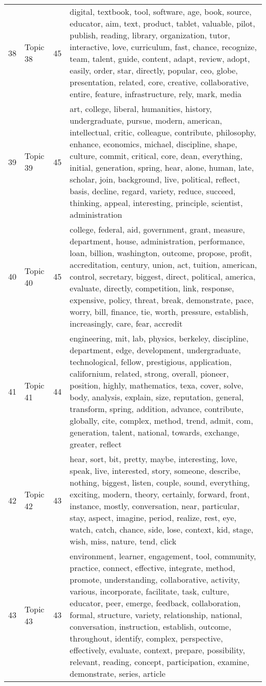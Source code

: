 \begin{table}[ht]
{\begin{tabularx}{\textwidth}{llrX}
   38 & Topic 38 & 45 & digital, textbook, tool, software, age, book, source, educator, aim, text, product, tablet, valuable, pilot, publish, reading, library, organization, tutor, interactive, love, curriculum, fast, chance, recognize, team, talent, guide, content, adapt, review, adopt, easily, order, star, directly, popular, ceo, globe, presentation, related, core, creative, collaborative, entire, feature, infrastructure, rely, mark, media \\ 
   39 & Topic 39 & 45 & art, college, liberal, humanities, history, undergraduate, pursue, modern, american, intellectual, critic, colleague, contribute, philosophy, enhance, economics, michael, discipline, shape, culture, commit, critical, core, dean, everything, initial, generation, spring, hear, alone, human, late, scholar, join, background, live, political, reflect, basis, decline, regard, variety, reduce, succeed, thinking, appeal, interesting, principle, scientist, administration \\ 
   40 & Topic 40 & 45 & college, federal, aid, government, grant, measure, department, house, administration, performance, loan, billion, washington, outcome, propose, profit, accreditation, century, union, act, tuition, american, control, secretary, biggest, direct, political, america, evaluate, directly, competition, link, response, expensive, policy, threat, break, demonstrate, pace, worry, bill, finance, tie, worth, pressure, establish, increasingly, care, fear, accredit \\ 
   41 & Topic 41 & 44 & engineering, mit, lab, physics, berkeley, discipline, department, edge, development, undergraduate, technological, fellow, prestigious, application, californium, related, strong, overall, pioneer, position, highly, mathematics, texa, cover, solve, body, analysis, explain, size, reputation, general, transform, spring, addition, advance, contribute, globally, cite, complex, method, trend, admit, com, generation, talent, national, towards, exchange, greater, reflect \\ 
   42 & Topic 42 & 43 & hear, sort, bit, pretty, maybe, interesting, love, speak, live, interested, story, someone, describe, nothing, biggest, listen, couple, sound, everything, exciting, modern, theory, certainly, forward, front, instance, mostly, conversation, near, particular, stay, aspect, imagine, period, realize, rest, eye, watch, catch, chance, side, lose, context, kid, stage, wish, miss, nature, tend, click \\ 
   43 & Topic 43 & 43 & environment, learner, engagement, tool, community, practice, connect, effective, integrate, method, promote, understanding, collaborative, activity, various, incorporate, facilitate, task, culture, educator, peer, emerge, feedback, collaboration, formal, structure, variety, relationship, national, conversation, instruction, establish, outcome, throughout, identify, complex, perspective, effectively, evaluate, context, prepare, possibility, relevant, reading, concept, participation, examine, demonstrate, series, article \\ 

\end{tabularx}}
\end{table}
